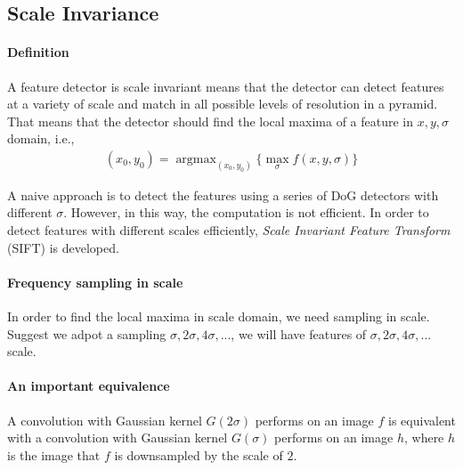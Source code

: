 \documentclass[runningheads]{llncs}
\begin{document}
\subsection{Scale Invariance}
\paragraph{Definition}
A feature detector is scale invariant means that
the detector can detect features at a variety of scale
and match in all possible levels of resolution in a pyramid.
That means that the detector should find the local
maxima of a feature in $x, y, \sigma$ domain, i.e.,
\begin{align}
    (x_0, y_0) = \mathop{\arg\max}_{(x_0, y_0)} \{\mathop{\max}_{\sigma} f(x, y, \sigma) \}
\end{align}

\par
A naive approach is to detect the features using a series of
DoG detectors with different $\sigma$.
However, in this way, the computation is not efficient.
In order to detect features with different scales efficiently,
\emph{Scale Invariant Feature Transform} (SIFT) is developed.

\paragraph{Frequency sampling in scale}
In order to find the local maxima in scale domain, we need sampling in scale.
Suggest we adpot a sampling $\sigma, 2\sigma, 4\sigma,...$, we will have features
of $\sigma, 2\sigma, 4\sigma,...$ scale.

\paragraph{An important equivalence}
A convolution with Gaussian kernel $G(2\sigma)$ performs on an image $f$
is equivalent with a convolution with Gaussian kernel $G(\sigma)$ performs on an image $h$,
where $h$ is the image that $f$ is downsampled by the scale of $2$.
\end{document}
